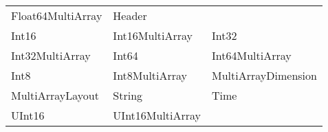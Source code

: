 \begin{longtable}[]{@{}lll@{}}
\begin{minipage}[t]{0.30\columnwidth}
Float64MultiArray\strut
\end{minipage} & \begin{minipage}[t]{0.30\columnwidth}\raggedright
Header\strut
\end{minipage}\tabularnewline
\begin{minipage}[t]{0.30\columnwidth}\raggedright
Int16\strut
\end{minipage} & \begin{minipage}[t]{0.30\columnwidth}\raggedright
Int16MultiArray\strut
\end{minipage} & \begin{minipage}[t]{0.30\columnwidth}\raggedright
Int32\strut
\end{minipage}\tabularnewline
\begin{minipage}[t]{0.30\columnwidth}\raggedright
Int32MultiArray\strut
\end{minipage} & \begin{minipage}[t]{0.30\columnwidth}\raggedright
Int64\strut
\end{minipage} & \begin{minipage}[t]{0.30\columnwidth}\raggedright
Int64MultiArray\strut
\end{minipage}\tabularnewline
\begin{minipage}[t]{0.30\columnwidth}\raggedright
Int8\strut
\end{minipage} & \begin{minipage}[t]{0.30\columnwidth}\raggedright
Int8MultiArray\strut
\end{minipage} & \begin{minipage}[t]{0.30\columnwidth}\raggedright
MultiArrayDimension\strut
\end{minipage}\tabularnewline
\begin{minipage}[t]{0.30\columnwidth}\raggedright
MultiArrayLayout\strut
\end{minipage} & \begin{minipage}[t]{0.30\columnwidth}\raggedright
String\strut
\end{minipage} & \begin{minipage}[t]{0.30\columnwidth}\raggedright
Time\strut
\end{minipage}\tabularnewline
\begin{minipage}[t]{0.30\columnwidth}\raggedright
UInt16\strut
\end{minipage} & \begin{minipage}[t]{0.30\columnwidth}\raggedright
UInt16MultiArray\strut
\end{minipage} & \begin{minipage}[t]{0.30\columnwidth}\raggedright

\end{minipage}
\end{longtable}

